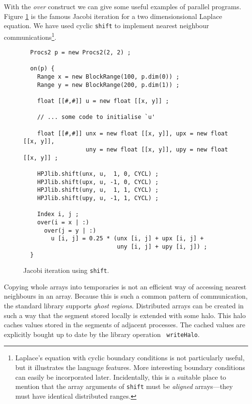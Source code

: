 With the {\em over} construct we can give some useful
examples of parallel programs.  Figure \ref{Jacobi} is the
famous Jacobi iteration for a two dimensionsional Laplace
equation.  We have used cyclic {\tt shift} to implement nearest
neighbour communications\footnote{Laplace's equation with
cyclic boundary conditions is not particularly useful,
but it illustrates the language features.
More interesting boundary conditions can easily be incorporated later.
Incidentally, this is a suitable place
to mention that the array arguments of {\tt shift} must be
{\em aligned} arrays---they must have identical distributed ranges.}.

\begin{figure}[btp]
\small
\begin{verbatim}
  Procs2 p = new Procs2(2, 2) ;

  on(p) {
    Range x = new BlockRange(100, p.dim(0)) ;
    Range y = new BlockRange(200, p.dim(1)) ;

    float [[#,#]] u = new float [[x, y]] ;

    // ... some code to initialise `u'

    float [[#,#]] unx = new float [[x, y]], upx = new float [[x, y]],
                  uny = new float [[x, y]], upy = new float [[x, y]] ;

    HPJlib.shift(unx, u,  1, 0, CYCL) ;
    HPJlib.shift(upx, u, -1, 0, CYCL) ;
    HPJlib.shift(uny, u,  1, 1, CYCL) ;
    HPJlib.shift(upy, u, -1, 1, CYCL) ;

    Index i, j ;
    over(i = x | :)
      over(j = y | :)
        u [i, j] = 0.25 * (unx [i, j] + upx [i, j] +
                           uny [i, j] + upy [i, j]) ;
  }
\end{verbatim}
\normalsize
\caption{\label{Jacobi}Jacobi iteration using {\tt shift}.}
\end{figure}

Copying whole arrays into temporaries is not an efficient way
of accessing nearest neighbours in an array.  Because this is
such a common pattern of communication, the standard library supports
{\em ghost regions}.  Distributed arrays can be created in such a way
that the segment stored locally is extended with some halo.  This halo
caches values stored in the segments of adjacent processes.  The cached
values are explicitly bought up to date by the library operation {\tt
writeHalo}.

